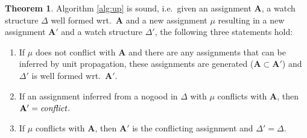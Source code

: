 \documentclass{vutinfth} %
\theoremstyle{example}
\theoremstyle{definition}
\theoremstyle{theorem}
\newtheorem{theorem}{Theorem}[section]
\theoremstyle{lemma}
\theoremstyle{corollary}
\newcommand{\ass}{\mathbf{A}}
\newcommand{\welf}{well formed\xspace}
\newcommand{\sgl}{\mu}
\begin{document}
\begin{theorem}
Algorithm \ref{alg:up} is sound, i.e.~given an assignment $\ass$, a watch structure $\Delta$ \welf wrt.~$\ass$ and a new assignment $\sgl$ resulting in a new assignment $\ass'$ and a watch structure $\Delta'$, the following three statements hold:
\begin{enumerate}
\item If $\sgl$ does not conflict with $\ass$ and there are any assignments that can be inferred by unit propagation, these assignments are generated ($\ass \subset \ass'$) and $\Delta'$ is \welf wrt.~$\ass'$.
\item If an assignment inferred from a nogood in $\Delta$ with $\sgl$ conflicts with $\ass$, then $\ass' = \emph{conflict}$.
\item If $\sgl$ conflicts with $\ass$, then $\ass'$ is the conflicting assignment and  $\Delta' = \Delta$.
\end{enumerate}
\end{theorem}
\end{document}
